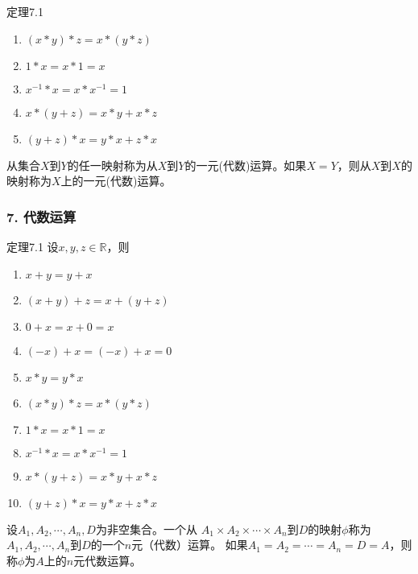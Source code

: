 \documentclass{beamer}
\begin{document}
\begin{CJK*}{UTF8}{gbsn}
\begin{frame}
\begin{minipage}[t]{0.49\linewidth}
\begin{block}{定理7.1}
\begin{enumerate}
   \item   $(x * y) * z = x * (y *z)$
   \item   $1 * x = x * 1 = x$
   \item   $x^{-1} * x = x * x^{-1} = 1$
   \item   $x* (y + z) = x * y + x * z$
   \item   $(y + z) * x = y * x + z * x$
    \end{enumerate}
  \end{block}\pause
\end{minipage}
\begin{minipage}[t]{0.49\linewidth}
  \begin{Def}
    从集合$X$到$Y$的任一映射称为从$X$到$Y$的\alert{一元(代数)运算}。如果$X=Y$，则从$X$到$X$的映射称为$X$上的\alert{一元(代数)运算}。
  \end{Def}
\end{minipage}
\end{frame}

\begin{frame}
  \frametitle{7. 代数运算}
  \begin{minipage}[t]{0.49\linewidth}
  \begin{block}{定理7.1}
    设$x, y, z \in \mathbb{R}$，则
   \begin{enumerate}
   \item   $x + y = y + x$
   \item   $(x + y) + z = x + (y + z)$
   \item   $0 + x = x + 0 = x$
   \item   $(-x) + x = (-x) + x = 0$
   \item   $x * y = y * x$
   \item   $(x * y) * z = x * (y *z)$
   \item   $1 * x = x * 1 = x$
   \item   $x^{-1} * x = x * x^{-1} = 1$
   \item   $x* (y + z) = x * y + x * z$
   \item   $(y + z) * x = y * x + z * x$
    \end{enumerate}
  \end{block}\pause
\end{minipage}
\begin{minipage}[t]{0.49\linewidth}
  \begin{Def}
    设$A_1, A_2, \cdots, A_n, D$为非空集合。一个从 $A_1\times A_2\times \cdots \times A_n$到$D$的映射$\phi$称为$A_1, A_2, \cdots, A_n$到$D$的一个\alert{$n$元（代数）运算}。
    如果$A_1=A_2=\cdots=A_n=D=A$，则称$\phi$为$A$上的\alert{$n$元代数运算}。
  \end{Def}
\end{minipage}
\end{frame}


\end{CJK*}
\end{document}
